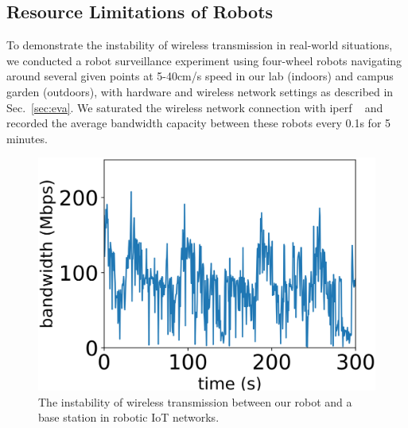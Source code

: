 
\subsection{Resource Limitations of Robots}

To demonstrate the instability of wireless transmission in real-world situations, we conducted a robot surveillance experiment using four-wheel robots navigating around several given points at 5-40cm/s speed in our lab (indoors) and campus garden (outdoors), with hardware and wireless network settings as described in Sec.~\ref{sec:eva}. 
We saturated the wireless network connection with iperf ~\cite{noauthor_iperf_nodate} and recorded the average bandwidth capacity between these robots every 0.1s for 5 minutes.

\begin{figure}[htp]
    \centering
    \includegraphics[width=0.5\linewidth]{fig/indoors_01.png}
    \caption{The instability of wireless transmission between our robot and a base station in robotic IoT networks.}
    \label{fig:bandwidth} 
\end{figure}

